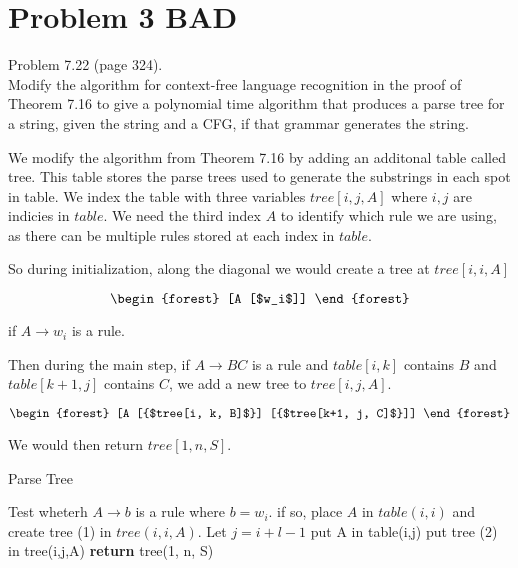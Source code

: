 \documentclass[11pt]{article}
\begin{document}
\newpage
\section*{Problem 3 BAD}

Problem 7.22 (page 324).\\
Modify the algorithm for context-free language recognition in the proof of Theorem 7.16 to give a polynomial time algorithm that produces a parse tree for a
string, given the string and a CFG, if that grammar generates the string.
\newline


We modify the algorithm from Theorem 7.16 by adding an additonal table called tree. This table stores the parse trees used to generate the substrings in each spot in table. We index the table with three variables $tree[i, j, A]$ where $i, j$ are indicies in $table$. We need the third index $A$ to identify which rule we are using, as there can be multiple rules stored at each index in $table$. 

So during initialization, along the diagonal we would create a tree at $tree[i,i, A]$

\begin{equation}
\begin{forest}
[A [$w_i$]]
\end{forest}
\end{equation}


if $A \rightarrow w_i$ is a rule.

Then during the main step, if $A \rightarrow BC$ is a rule and $table[i,k]$ contains $B$ and $table[k+1, j]$ contains $C$, we add a new tree to $tree[i, j, A]$. 

\begin{equation}
\begin{forest}
[A [{$tree[i, k, B]$}]  [{$tree[k+1, j, C]$}]]
\end{forest}
\end{equation}


We would then return $tree[1, n, S]$.

\begin{algorithm}
    \caption{Parse Tree}\label{guests}
    \begin{algorithmic}[1]
				\State Test wheterh $A \rightarrow b$ is a rule where $b = w_i$.
				\State if so, place $A$ in $table(i,i)$ and create tree (1) in $tree(i, i, A)$. 
			\EndFor
		\EndFor
				\State Let $j = i + l - 1$
							\State put A in table(i,j)
							\State put tree (2) in tree(i,j,A)
						\EndIf	
					\EndFor				
				\EndFor			
			\EndFor
		\EndFor
       \State \textbf{return} tree(1, n, S)
    \EndFunction
    \end{algorithmic}
\end{algorithm}
\end{document}

